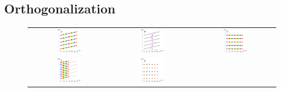 \documentclass{article}
\begin{document}
\subsection{Orthogonalization}
\label{sect:ortho}
\begin{figure}
	\centering
	\begin{tabular}{ccc}
		\includegraphics[width=0.32\textwidth]{plots/shift1.pdf} &
		\includegraphics[width=0.32\textwidth]{plots/shift2.pdf} &
		\includegraphics[width=0.32\textwidth]{plots/shift3.pdf} \\
		\includegraphics[width=0.32\textwidth]{plots/shift6.pdf} &
		\includegraphics[width=0.32\textwidth]{plots/shift5.pdf} &

\end{tabular}
\end{figure}
\end{document}
